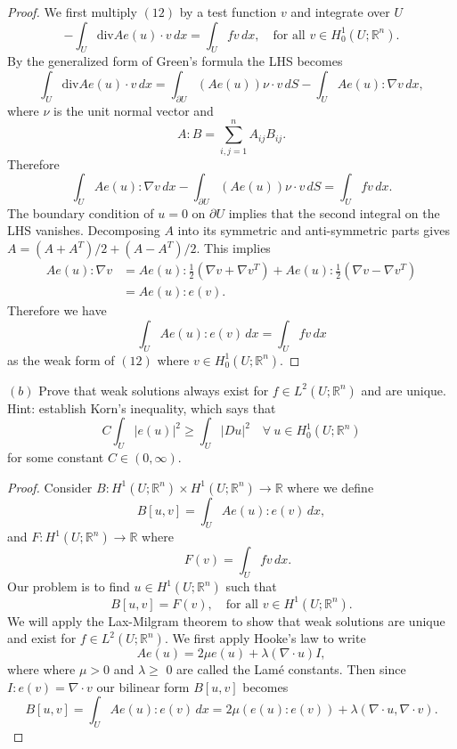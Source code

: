 \documentclass{article}
\begin{document}
\begin{flushleft}
\begin{proof}
We first multiply $(12)$ by a test function $v$ and integrate over $U$
$$-\int_U\text{div}Ae(u)\cdot v\,dx=\int_U fv\,dx,\quad \text{for all $v\in H_0^1(U;\mathbb R^n)$.}$$
By the generalized form of Green's formula the LHS becomes
$$\int_U \text{div}Ae(u)\cdot v\,dx = \int_{\partial U} (Ae(u))\nu\cdot v\,dS - \int_U Ae(u):\nabla v\,dx,$$
where $\nu$ is the unit normal vector and
$$A:B = \sum_{i,j=1}^n A_{ij}B_{ij}.$$
Therefore
$$\int_U Ae(u):\nabla v\,dx - \int_{\partial U} (Ae(u))\nu\cdot v\,dS =\int_U fv\,dx.$$
The boundary condition of $u=0$ on $\partial U$ implies that the second integral on the LHS vanishes. Decomposing $A$ into its symmetric and anti-symmetric parts gives $A=(A+A^T)/2 + (A-A^T)/2$. This implies
\begin{align*}Ae(u):\nabla v &= Ae(u):\frac{1}{2}\left(\nabla v + \nabla v^T\right) + Ae(u):\frac{1}{2}\left(\nabla v - \nabla v^T\right)\\&=Ae(u):e(v).
\end{align*}
Therefore we have
$$\int_U Ae(u):e(v)\,dx=\int_U fv\,dx$$
as the weak form of $(12)$ where $v\in H_0^1(U;\mathbb R^n)$.
\end{proof}
$(b)$ Prove that weak solutions always exist for $f\in L^2(U;\mathbb R^n)$ and are unique. Hint: establish Korn’s inequality, which says that
$$C\int_U |e(u)|^2 \ge \int_U |Du|^2 \quad \forall~u\in H_0^1(U;\mathbb R^n)$$
for some constant $C\in(0,\infty).$
\begin{proof} Consider $B:H^1(U;\mathbb R^n)\times H^1(U;\mathbb R^n)\to \mathbb R$ where we define
$$B[u,v]=\int_U Ae(u):e(v)\,dx,$$
and $F:H^1(U;\mathbb R^n)\to\mathbb R$ where
$$\quad F(v)=\int_U fv\,dx.$$
Our problem is to find $u\in H^1(U;\mathbb R^n)$ such that
$$B[u,v]=F(v),\quad \text{for all $v\in H^1(U;\mathbb R^n)$.}$$
We will apply the Lax-Milgram theorem to show that weak solutions are unique and exist for $f\in L^2(U;\mathbb R^n)$. We first apply Hooke's law to write
$$Ae(u)=2\mu e(u)+\lambda(\nabla \cdot u)I,$$
where where $\mu > 0$ and $\lambda\ge$ 0 are called the Lamé constants. Then since $I:e(v)=\nabla \cdot v$ our bilinear form $B[u,v]$ becomes
$$B[u,v]=\int_U Ae(u):e(v)\,dx=2\mu(e(u):e(v))+\lambda(\nabla\cdot u, \nabla \cdot v).$$



\end{proof}
\end{flushleft}
\end{document}
